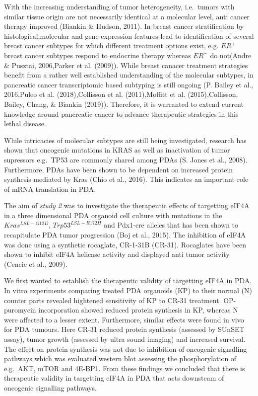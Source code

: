 \documentclass[12pt,openany]{book}
\begin{document}
With the increasing understanding of tumor heterogeneity, i.e.~tumors
with similar tissue origin are not necessarily identical at a molecular
level, anti cancer therapy improved (Biankin \& Hudson, 2011). In breast
cancer stratification by histological,molecular and gene expression
features lead to identification of several breast cancer subtypes for
which different treatment options exist, e.g. \(ER^+\) breast cancer
subtypes respond to endocrine therapy whereas \(ER^-\) do not(Andre \&
Pusztai, 2006,Parker et al. (2009)). While breast canacer treatment
strategies benefit from a rather well established understanding of the
molecular subtypes, in pancreatic cancer transcriptomic based subtyping
is still ongoing (P. Bailey et al., 2016,Puleo et al. (2018),Collisson
et al. (2011),Moffitt et al. (2015),Collisson, Bailey, Chang, \& Biankin
(2019)). Therefore, it is warranted to extend current knowledge around
pancreatic cancer to advance therapeutic strategies in this lethal
disease.

While intricacies of molecular subtypes are still being investigated,
research has shown that oncogenic mutations in KRAS as well as
inactivation of tumor supressors e.g.~TP53 are commonly shared among
PDAs (S. Jones et al., 2008). Furthermore, PDAs have been shown to be
dependent on increased protein synthesis mediated by Kras (Chio et al.,
2016). This indicates an important role of mRNA translation in PDA.

The aim of \emph{study 2} was to investigate the therapeutic effects of
targetting eIF4A in a three dimensional PDA organoid cell culture with
mutations in the \(Kras^{LSL-G12D}\), \(Trp53^{LSL-R172H}\) and Pdx1-cre
alleles that has been shown to recapitulate PDA tumor progression (Boj
et al., 2015). The inhibition of eIF4A was done using a synthetic
rocaglate, CR-1-31B (CR-31). Rocaglates have been shown to inhibit eIF4A
helicase activity and displayed anti tumor activity (Cencic et al.,
2009).

We first wanted to establish the therapeutic validity of targetting
eIF4A in PDA. In vitro experiments comparing treated PDA organoids (KP)
to their normal (N) counter parts revealed hightened sensitivity of KP
to CR-31 treatment. OP-puromycin incorporation showed reduced protein
synthesis in KP, whereas N were affected to a lesser extent.
Furthermore, similar effects were found in vivo for PDA tumours. Here
CR-31 reduced protein synthesis (assessed by SUnSET assay), tumor growth
(assessed by ultra sound imaging) and increased survival. The effect on
protein synthesis was not due to inhibition of oncogenic signalling
pathways which was evaluated western blot assessing the phosphorylation
of e.g.~AKT, mTOR and 4E-BP1. From these findings we concluded that
there is therapeutic validity in targetting eIF4A in PDA that acts
downsteam of oncogenic signalling pathways.
\end{document}
